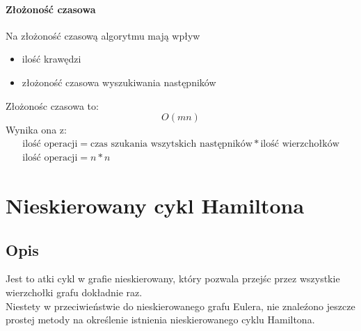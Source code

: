\documentclass[]{article}
\begin{document}
		\paragraph{Złożoność czasowa}
		Na złożoność czasową algorytmu mają wpływ
		\begin{itemize}
			\item ilość krawędzi
			\item złożoność czasowa wyszukiwania następników
		\end{itemize}
		Złożonośc czasowa to:
		\begin{equation}
			O(mn)
		\end{equation}
		Wynika ona z:
		\begin{gather}
			\text{ilość operacji} = \text{czas szukania wszytskich następników} * \text{ilość wierzchołków} \\
			\text{ilość operacji} = n * n
		\end{gather}
		
\clearpage
\section{Nieskierowany cykl Hamiltona}
	\subsection{Opis}
		Jest to atki cykl w grafie nieskierowany, który pozwala przejśc przez wszystkie wierzchołki grafu dokładnie raz. \\
		Niestety w przeciwieństwie do nieskierowanego grafu Eulera, nie znaleźono jeszcze prostej metody na określenie istnienia nieskierowanego cyklu Hamiltona.
		
\end{document}
